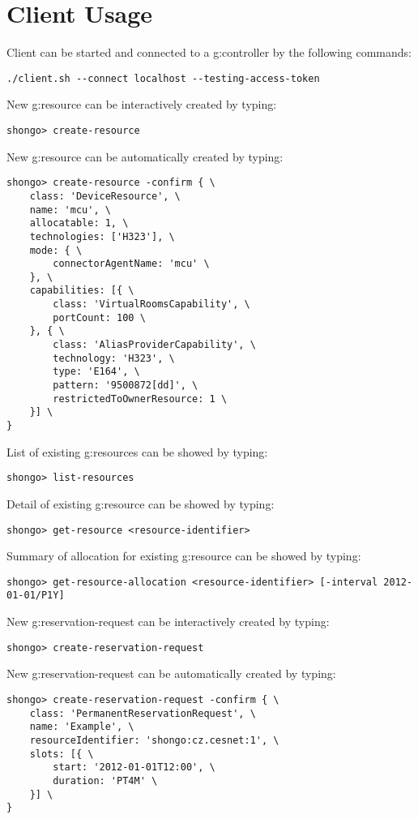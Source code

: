 \appendix



\chapter{Client Usage}

Client can be started and connected to a \gls{g:controller} by the following commands:
\begin{verbatim}
./client.sh --connect localhost --testing-access-token
\end{verbatim}
New \gls{g:resource} can be interactively created by typing:
\begin{verbatim}
shongo> create-resource
\end{verbatim}
New \gls{g:resource} can be automatically created by typing:
\begin{verbatim}
shongo> create-resource -confirm { \
    class: 'DeviceResource', \
    name: 'mcu', \
    allocatable: 1, \
    technologies: ['H323'], \
    mode: { \
        connectorAgentName: 'mcu' \
    }, \
    capabilities: [{ \
        class: 'VirtualRoomsCapability', \
        portCount: 100 \
    }, { \
        class: 'AliasProviderCapability', \
        technology: 'H323', \
        type: 'E164', \
        pattern: '9500872[dd]', \
        restrictedToOwnerResource: 1 \
    }] \
}
\end{verbatim}
List of existing \glspl{g:resource} can be showed by typing:
\begin{verbatim}
shongo> list-resources
\end{verbatim}
Detail of existing \gls{g:resource} can be showed by typing:
\begin{verbatim}
shongo> get-resource <resource-identifier>
\end{verbatim}
Summary of allocation for existing \gls{g:resource} can be showed by typing:
\begin{verbatim}
shongo> get-resource-allocation <resource-identifier> [-interval 2012-01-01/P1Y]
\end{verbatim}
New \gls{g:reservation-request} can be interactively created by typing:
\begin{verbatim}
shongo> create-reservation-request
\end{verbatim}
New \gls{g:reservation-request} can be automatically created by typing:
\begin{verbatim}
shongo> create-reservation-request -confirm { \
    class: 'PermanentReservationRequest', \
    name: 'Example', \
    resourceIdentifier: 'shongo:cz.cesnet:1', \
    slots: [{ \
        start: '2012-01-01T12:00', \
        duration: 'PT4M' \
    }] \
}
\end{verbatim}

